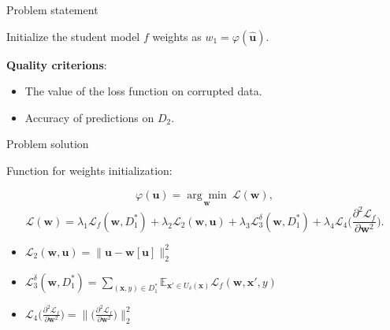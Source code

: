 \documentclass[dvipsnames]{beamer}
\begin{document}

\begin{frame}{Problem statement}

    Initialize the student model $f$ weights as $w_1 = \varphi(\hat{\textbf{u}})$.
    
    \bigskip
    
    \textbf{Quality criterions}:
    \begin{itemize}
        \item The value of the loss function on corrupted data.
    
        \item Accuracy of predictions on $D_2$.
    \end{itemize}

\end{frame}


\begin{frame}{Problem solution}
    
    Function for weights initialization:
    
    $$\varphi(\mathbf{u}) = \underset{\mathbf{w}}{\arg\min}~\mathcal{L}(\mathbf{w}),$$
 \[\mathcal{L}(\textbf{w}) = \lambda_1 \mathcal{L}_f(\mathbf{w}, D_1^*) + \lambda_2 \mathcal{L}_2 (\mathbf{w}, \mathbf{u}) + \lambda_3 \mathcal{L}_3^\delta (\mathbf{w}, D_1^*) + \lambda_4 \mathcal{L}_4 \bigl(\displaystyle \frac{\partial^2 \mathcal{L}_f}{\partial \mathbf{w}^2}\bigr).\]

    \begin{itemize}
        \item $\mathcal{L}_2 (\mathbf{w}, \mathbf{u}) = \|\textbf{u} - \textbf{w}[\textbf{u}]\|^2_2$
        \item $\mathcal{L}_3^\delta (\mathbf{w}, D_1^*) = \displaystyle \sum \limits_{(\textbf{x}, y) \in D_1^*} \displaystyle \mathbb{E}_{\textbf{x}' \in U_\delta(\textbf{x})} \mathcal{L}_f(\mathbf{w}, \textbf{x}', y)$
        \item $\mathcal{L}_4 \bigl(\displaystyle \frac{\partial^2 \mathcal{L}_f}{\partial \mathbf{w}^2}\bigr) = \|\bigl(\displaystyle \frac{\partial^2 \mathcal{L}_f}{\partial \mathbf{w}^2}\bigr)\|^2_2$
    \end{itemize}

\end{frame}

\end{document}
